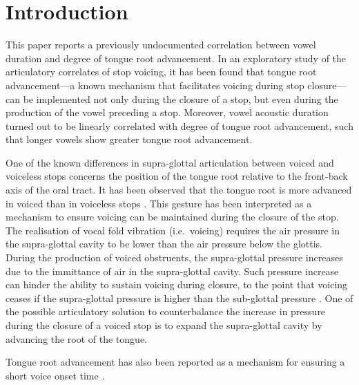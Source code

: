 \documentclass[]{JASAnew}
\begin{document}
\hypertarget{introduction}{%
\section{Introduction}\label{introduction}}

This paper reports a previously undocumented correlation between vowel
duration and degree of tongue root advancement. In an exploratory study
of the articulatory correlates of stop voicing, it has been found that
tongue root advancement---a known mechanism that facilitates voicing
during stop closure---can be implemented not only during the closure of
a stop, but even during the production of the vowel preceding a stop.
Moreover, vowel acoustic duration turned out to be linearly correlated
with degree of tongue root advancement, such that longer vowels show
greater tongue root advancement.

One of the known differences in supra-glottal articulation between
voiced and voiceless stops concerns the position of the tongue root
relative to the front-back axis of the oral tract. It has been observed
that the tongue root is more advanced in voiced than in voiceless stops
\citep{kent1969,perkell1969,westbury1983}. This gesture has been
interpreted as a mechanism to ensure voicing can be maintained during
the closure of the stop. The realisation of vocal fold vibration
(i.e.~voicing) requires the air pressure in the supra-glottal cavity to
be lower than the air pressure below the glottis. During the production
of voiced obstruents, the supra-glottal pressure increases due to the
immittance of air in the supra-glottal cavity. Such pressure increase
can hinder the ability to sustain voicing during closure, to the point
that voicing ceases if the supra-glottal pressure is higher than the
sub-glottal pressure \citep{ohala2011}. One of the possible articulatory
solution to counterbalance the increase in pressure during the closure
of a voiced stop is to expand the supra-glottal cavity by advancing the
root of the tongue.

Tongue root advancement has also been reported as a mechanism for
ensuring a short voice onset time \citep{ahn2016}.
\end{document}

